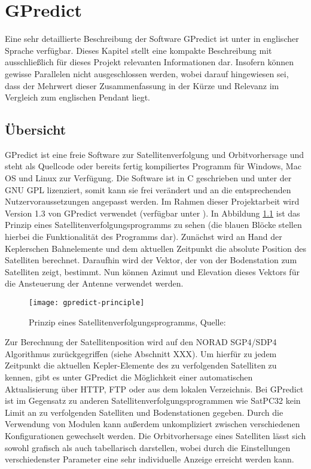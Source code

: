\chapter{GPredict}

Eine sehr detaillierte Beschreibung der Software GPredict ist unter \cite{gpredictmanual} in englischer Sprache verfügbar. Dieses Kapitel stellt eine kompakte Beschreibung mit ausschließlich für dieses Projekt relevanten Informationen dar. Insofern können gewisse Parallelen nicht ausgeschlossen werden, wobei darauf hingewiesen sei, dass der Mehrwert dieser Zusammenfassung in der Kürze und Relevanz im Vergleich zum englischen Pendant liegt.

\section{Übersicht}

GPredict ist eine freie Software zur Satellitenverfolgung und Orbitvorhersage und steht als Quellcode oder bereits fertig kompiliertes Programm für Windows, Mac OS und Linux zur Verfügung. Die Software ist in C geschrieben und unter der GNU \ac{GPL} lizenziert, somit kann sie frei verändert und an die entsprechenden Nutzervoraussetzungen angepasst werden. Im Rahmen dieser Projektarbeit wird Version 1.3 von GPredict verwendet (verfügbar unter \cite{gpredictdownload}).\newpar
In Abbildung \ref{fig:gpredict-principle} ist das Prinzip eines Satellitenverfolgungsprogramms zu sehen (die blauen Blöcke stellen hierbei die Funktionalität des Programms dar). Zunächst wird an Hand der Keplerschen Bahnelemente und dem aktuellen Zeitpunkt die absolute Position des Satelliten berechnet. Daraufhin wird der Vektor, der von der Bodenstation zum Satelliten zeigt, bestimmt. Nun können Azimut und Elevation dieses Vektors für die Ansteuerung der Antenne verwendet werden.

\begin{figure}[h]
	\centering
	\texttt{[image: gpredict-principle]}
	\caption{Prinzip eines Satellitenverfolgungsprogramms, Quelle: \cite{gpredictmanual}}
	\label{fig:gpredict-principle} 
\end{figure}

\clearpage

Zur Berechnung der Satellitenposition wird auf den NORAD SGP4/SDP4 Algorithmus zurückgegriffen (siehe Abschnitt XXX). Um hierfür zu jedem Zeitpunkt die aktuellen Kepler-Elemente des zu verfolgenden Satelliten zu kennen, gibt es unter GPredict die Möglichkeit einer automatischen Aktualisierung über HTTP, FTP oder aus dem lokalen Verzeichnis.\newpar
Bei GPredict ist im Gegensatz zu anderen Satellitenverfolgungsprogrammen wie SatPC32 kein Limit an zu verfolgenden Satelliten und Bodenstationen gegeben. Durch die Verwendung von Modulen kann außerdem unkompliziert zwischen verschiedenen Konfigurationen gewechselt werden. Die Orbitvorhersage eines Satelliten lässt sich sowohl grafisch als auch tabellarisch darstellen, wobei durch die Einstellungen verschiedenster Parameter eine sehr individuelle Anzeige erreicht werden kann.

